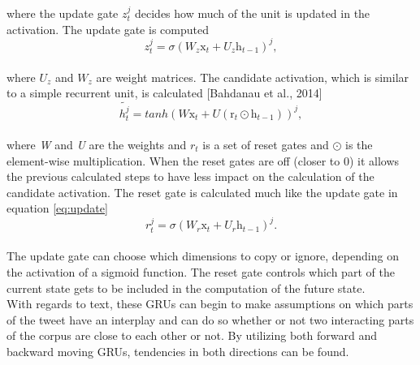 where the update gate $z_{t}^{j}$ decides how much of the unit is updated in the activation. The update gate is computed\\

\begin{equation}\label{eq:update}
z_{t}^{j}=\sigma\left(W_{z}\mathrm{x}_{t}+U_{z}\mathrm{h}_{t-1}\right)^{j},
\end{equation}\\

where $U_{z}$ and $W_{z}$ are weight matrices. The candidate activation, which is similar to a simple recurrent unit, is calculated [Bahdanau et al., 2014]\\

\begin{equation} \label{eq:candidate}
\tilde{h_{t}^{j}} = tanh\left(W\mathrm{x}_{t}+U\left(\mathrm{r}_{t}\odot\mathrm{h}_{t-1}\right)\right)^{j},
\end{equation}\\

where \textit{W} and \textit{U} are the weights and $r_{t}$ is a set of reset gates and $\odot$ is the element-wise multiplication. When the reset gates are off (closer to 0) it allows the previous calculated steps to have less impact on the calculation of the candidate activation. The reset gate is calculated much like the update gate in equation \ref{eq:update}\\

\begin{equation}\label{eq:reset}
r_{t}^{j}=\sigma\left(W_{r}\mathrm{x}_{t}+U_{r}\mathrm{h}_{t-1}\right)^{j}.
\end{equation}\\

The update gate can choose which dimensions to copy or ignore, depending on the activation of a sigmoid function. The reset gate controls which part of the current state gets to be included in the computation of the future state.\\
With regards to text, these GRUs can begin to make assumptions on which parts of the tweet have an interplay and can do so whether or not two interacting parts of the corpus are close to each other or not. By utilizing both forward and backward moving GRUs, tendencies in both directions can be found.

